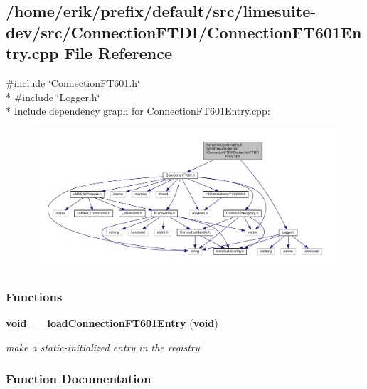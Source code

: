 \subsection{/home/erik/prefix/default/src/limesuite-\/dev/src/\+Connection\+F\+T\+D\+I/\+Connection\+F\+T601\+Entry.cpp File Reference}
\label{ConnectionFT601Entry_8cpp}
{\ttfamily \#include \char`\"{}Connection\+F\+T601.\+h\char`\"{}}\\*
{\ttfamily \#include \char`\"{}Logger.\+h\char`\"{}}\\*
Include dependency graph for Connection\+F\+T601\+Entry.\+cpp\+:
\nopagebreak
\begin{figure}[H]
\begin{center}
\leavevmode
\includegraphics[width=350pt]{d4/d8b/ConnectionFT601Entry_8cpp__incl}
\end{center}
\end{figure}
\subsubsection*{Functions}
\begin{DoxyCompactItemize}
\item 
{\bf void} {\bf \+\_\+\+\_\+load\+Connection\+F\+T601\+Entry} ({\bf void})
\begin{DoxyCompactList}\small\item\em make a static-\/initialized entry in the registry \end{DoxyCompactList}\end{DoxyCompactItemize}


\subsubsection{Function Documentation}
